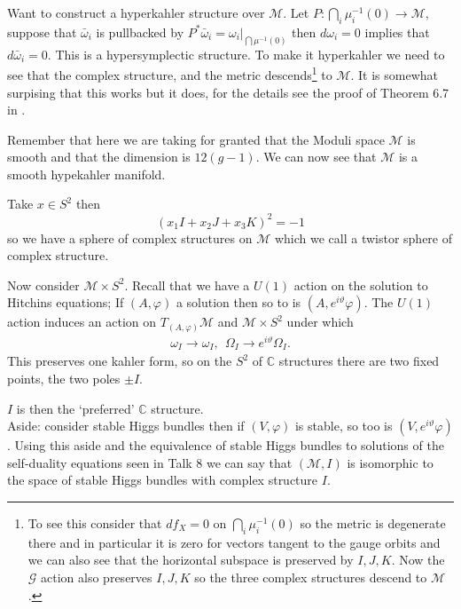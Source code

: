 Want to construct a hyperkahler structure over $\mathcal{M}$.
Let $ P : \bigcap_i \mu^{-1} _i (0) \rightarrow \mathcal{M} $, 
suppose that $ \bar{\omega}_i $ is pullbacked by $ P^* \bar{\omega}_i = \omega_i |_{\bigcap \mu^{-1}(0)}$ then $d\omega_{i}=0$ implies that $d\bar\omega_{i}=0$.
This is a hypersymplectic structure. To make it hyperkahler we need to see that the complex structure, and the metric descends\footnote{To see this consider that $df_{X}=0$ on $\bigcap_i \mu^{-1} _i (0)$ so the metric is degenerate there and in particular it is zero for vectors tangent to the gauge orbits and we can also see that the horizontal subspace is preserved by $I,J,K$. Now the $\mathcal{G}$ action also preserves $I,J,K$ so the three complex structures descend to $\mathcal{M}$.}  to $\mathcal{M}$. It is somewhat surpising that this works but it does, for the details see the proof of Theorem 6.7 in \cite{Hitchin}.

Remember that here we are taking for granted that the Moduli space $\mathcal{M}$ is smooth and that the dimension is $ 12(g-1) $. 
We can now see that $\mathcal{M}$ is a smooth hypekahler manifold. 
\begin{remark}
Take $x \in S^{2}$ then 
\begin{equation}
(x_{1}I+x_{2}J+x_{3}K)^{2}=-1
\end{equation}
so we have a sphere of complex structures on $\mathcal{M} $ which we call a twistor sphere of complex structure.
\end{remark}
Now consider $\mathcal{M}\times S^{2}$.
Recall that we have a $U(1)$ action on the solution to Hitchins equations;
If $(A, \varphi)$ a solution then so to is $( A, e^{i \vartheta}\varphi) $. 
The $U(1) $ action induces an action on $T_{(A,\varphi)}\mathcal{M}$ and $\mathcal{M}\times S^{2}$ under which 
\begin{align}
    \omega_I \rightarrow \omega_I , ~~ \Omega_I \rightarrow  e^{i \vartheta} \Omega_I .
\end{align}
This preserves one kahler form, so on the $S^2$ of $\mathbb{C} $ structures there are two fixed points, 
the two poles $ \pm I$.

$I$ is then the `preferred' $\mathbb{C} $ structure. \\

Aside: consider stable Higgs bundles then if $(V, \varphi) $ is stable, so too is $(V, e^{i\vartheta} \varphi) $. 
Using this aside and the equivalence of stable Higgs bundles to solutions of the self-duality equations seen in Talk 8 we can say that
$( \mathcal{M}, I) $ is isomorphic to the space of stable Higgs bundles with complex structure $I$.

